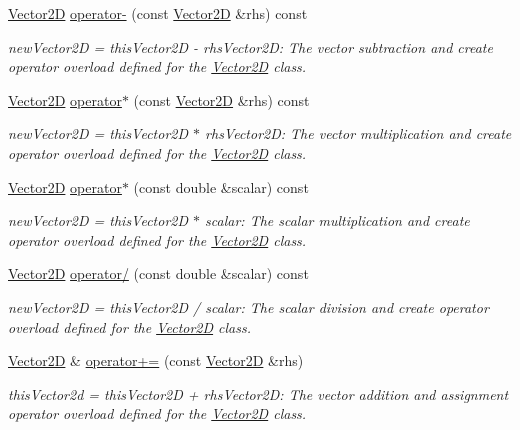 \begin{DoxyCompactItemize}
\hyperlink{class_vector2_d}{Vector2D} \hyperlink{class_vector2_d_a803ee7e8cc2bfac23eb9e3aeebd5be3f}{operator-\/} (const \hyperlink{class_vector2_d}{Vector2D} \&rhs) const
\begin{DoxyCompactList}\small\item\em new\+Vector2D = this\+Vector2D -\/ rhs\+Vector2D\+: The vector subtraction and create operator overload defined for the \hyperlink{class_vector2_d}{Vector2D} class. \end{DoxyCompactList}\item 
\hyperlink{class_vector2_d}{Vector2D} \hyperlink{class_vector2_d_a257aa1ca3260a4cacaa1171f67bf7910}{operator$\ast$} (const \hyperlink{class_vector2_d}{Vector2D} \&rhs) const
\begin{DoxyCompactList}\small\item\em new\+Vector2D = this\+Vector2D $\ast$ rhs\+Vector2D\+: The vector multiplication and create operator overload defined for the \hyperlink{class_vector2_d}{Vector2D} class. \end{DoxyCompactList}\item 
\hyperlink{class_vector2_d}{Vector2D} \hyperlink{class_vector2_d_a7ade542889c8e483b5cc536b2bf4f053}{operator$\ast$} (const double \&scalar) const
\begin{DoxyCompactList}\small\item\em new\+Vector2D = this\+Vector2D $\ast$ scalar\+: The scalar multiplication and create operator overload defined for the \hyperlink{class_vector2_d}{Vector2D} class. \end{DoxyCompactList}\item 
\hyperlink{class_vector2_d}{Vector2D} \hyperlink{class_vector2_d_adc10dc721432ed17e94602640bb24346}{operator/} (const double \&scalar) const
\begin{DoxyCompactList}\small\item\em new\+Vector2D = this\+Vector2D / scalar\+: The scalar division and create operator overload defined for the \hyperlink{class_vector2_d}{Vector2D} class. \end{DoxyCompactList}\item 
\hyperlink{class_vector2_d}{Vector2D} \& \hyperlink{class_vector2_d_affc6e2a6034a4c4249a3e8b17f633069}{operator+=} (const \hyperlink{class_vector2_d}{Vector2D} \&rhs)
\begin{DoxyCompactList}\small\item\em this\+Vector2d = this\+Vector2D + rhs\+Vector2D\+: The vector addition and assignment operator overload defined for the \hyperlink{class_vector2_d}{Vector2D} class. \end{DoxyCompactList}\item 

\end{DoxyCompactItemize}

